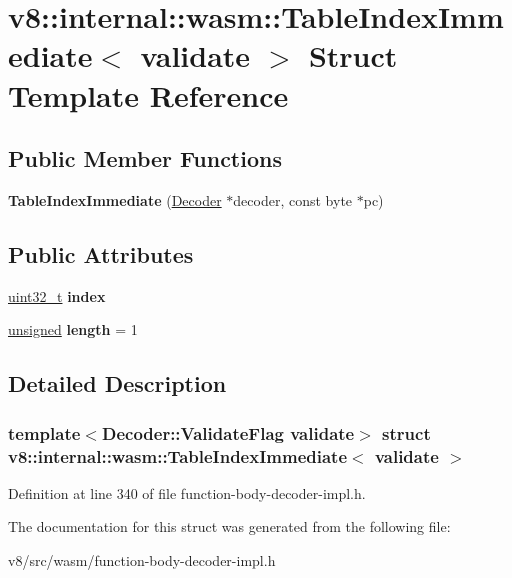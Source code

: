 \hypertarget{structv8_1_1internal_1_1wasm_1_1TableIndexImmediate}{}\section{v8\+:\+:internal\+:\+:wasm\+:\+:Table\+Index\+Immediate$<$ validate $>$ Struct Template Reference}
\label{structv8_1_1internal_1_1wasm_1_1TableIndexImmediate}
\subsection*{Public Member Functions}
\begin{DoxyCompactItemize}
\item 
\mbox{\label{structv8_1_1internal_1_1wasm_1_1TableIndexImmediate_a9913e81ec45680531c196b5221f20b3e}} 
{\bfseries Table\+Index\+Immediate} (\mbox{\hyperlink{classv8_1_1internal_1_1wasm_1_1Decoder}{Decoder}} $\ast$decoder, const byte $\ast$pc)
\end{DoxyCompactItemize}
\subsection*{Public Attributes}
\begin{DoxyCompactItemize}
\item 
\mbox{\label{structv8_1_1internal_1_1wasm_1_1TableIndexImmediate_a4a81d58f60fd040bd3f0ca9e17b88fbb}} 
\mbox{\hyperlink{classuint32__t}{uint32\+\_\+t}} {\bfseries index}
\item 
\mbox{\label{structv8_1_1internal_1_1wasm_1_1TableIndexImmediate_a359290774bc9c5045e437a16ebefc700}} 
\mbox{\hyperlink{classunsigned}{unsigned}} {\bfseries length} = 1
\end{DoxyCompactItemize}


\subsection{Detailed Description}
\subsubsection*{template$<$Decoder\+::\+Validate\+Flag validate$>$\newline
struct v8\+::internal\+::wasm\+::\+Table\+Index\+Immediate$<$ validate $>$}



Definition at line 340 of file function-\/body-\/decoder-\/impl.\+h.



The documentation for this struct was generated from the following file\+:\begin{DoxyCompactItemize}
\item 
v8/src/wasm/function-\/body-\/decoder-\/impl.\+h\end{DoxyCompactItemize}
